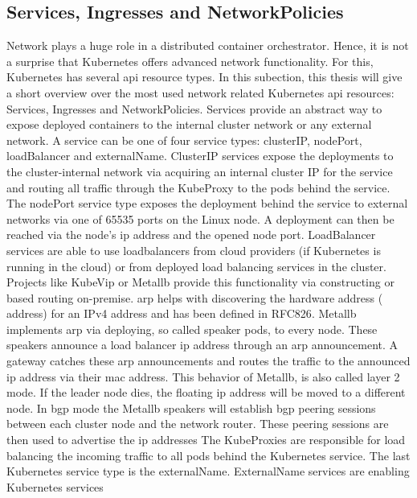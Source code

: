 \documentclass[titlepage]{report}
\begin{document}
\subsection{Services, Ingresses and NetworkPolicies}
Network plays a huge role in a distributed container orchestrator. Hence, it is not a surprise that Kubernetes offers advanced network functionality. For this, Kubernetes has several \gls{api} resource types.
In this subection, this thesis will give a short overview over the most used network related Kubernetes \gls{api} resources: Services, Ingresses and NetworkPolicies. Services provide an abstract way
to expose deployed containers to the internal cluster network or any external network. A service can be one of four service types: clusterIP, nodePort, loadBalancer and externalName. ClusterIP services
expose the deployments to the cluster-internal network\cite{KubernetesService} via acquiring an internal cluster IP for the service and routing all traffic through the KubeProxy to the pods behind the service.
The nodePort service type exposes the deployment behind the service to external networks via one of 65535 ports on the Linux node. A deployment can then be reached via the node's \gls{ip} address
and the opened node port. LoadBalancer services are able to use loadbalancers from cloud providers (if Kubernetes is running in the cloud) or from deployed load balancing services in the cluster. Projects
like KubeVip\cite{KubeVip} or Metallb\cite{Metallb} provide this functionality via constructing  or  based routing on-premise. \gls{arp} helps with discovering the hardware address ( address)
for an IPv4 address and has been defined in RFC826\cite{RFC826}. Metallb implements \gls{arp} via deploying, so called speaker pods, to every node. These speakers announce a load balancer \gls{ip} address
through an \gls{arp} announcement. A gateway catches these \gls{arp} announcements and routes the traffic to the announced \gls{ip} address via their \gls{mac} address. This behavior of Metallb, is also called layer 2 mode.
If the leader node dies, the floating \gls{ip} address will be moved to a different node\cite{MetallbLayer2}.
In \gls{bgp} mode the Metallb speakers will establish \gls{bgp} peering sessions between each cluster node and the network router. These peering sessions are then used to advertise the \gls{ip} addresses\cite{MetallbBGP}
The KubeProxies are responsible for load balancing the incoming traffic to all pods behind the Kubernetes service. The last Kubernetes service type is the externalName. ExternalName services are enabling Kubernetes services
\end{document}
